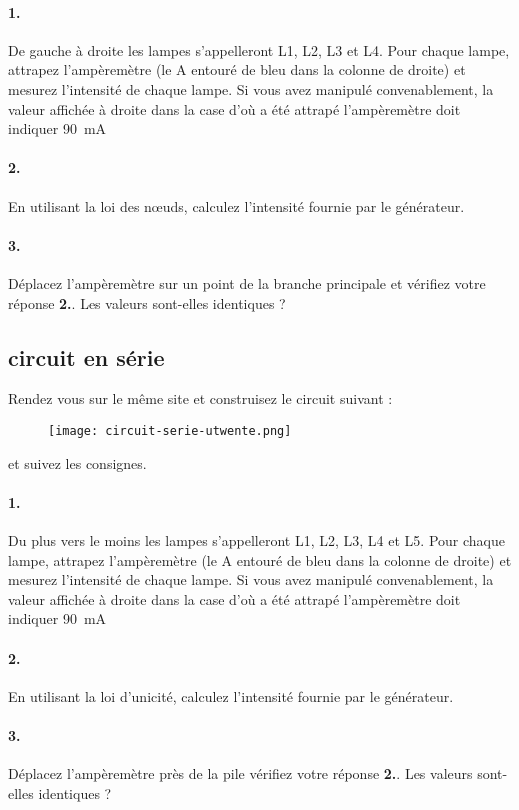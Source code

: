 \documentclass[12pt, a4paper]{article}
\begin{document}
\paragraph{1.} De gauche à droite les lampes s'appelleront L1, L2, L3 et L4.
Pour chaque lampe, attrapez l'ampèremètre (le A entouré de bleu dans la colonne de droite) et mesurez l'intensité de chaque lampe.
Si vous avez manipulé convenablement, la valeur affichée à droite dans la case d'où a été attrapé l'ampèremètre doit indiquer 90~mA

\paragraph{2.} En utilisant la loi des n\oe{}uds, calculez l'intensité fournie par le générateur.

\paragraph{3.} Déplacez l'ampèremètre sur un point de la branche principale et vérifiez votre réponse \textbf{2.}. Les valeurs sont-elles identiques ?

\subsection*{circuit en série}
Rendez vous sur le même site et construisez le circuit suivant :
\begin{figure}[H]
	\centering
	\texttt{[image: circuit-serie-utwente.png]}
\end{figure}
et suivez les consignes.
\paragraph{1.} Du plus vers le moins les lampes s'appelleront L1, L2, L3, L4 et L5.
Pour chaque lampe, attrapez l'ampèremètre (le A entouré de bleu dans la colonne de droite) et mesurez l'intensité de chaque lampe.
Si vous avez manipulé convenablement, la valeur affichée à droite dans la case d'où a été attrapé l'ampèremètre doit indiquer 90~mA

\paragraph{2.} En utilisant la loi d'unicité, calculez l'intensité fournie par le générateur.

\paragraph{3.} Déplacez l'ampèremètre près de la pile vérifiez votre réponse \textbf{2.}. Les valeurs sont-elles identiques ?
\end{document}
